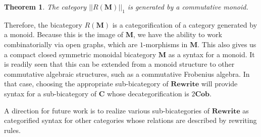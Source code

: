 \documentclass[11pt]{amsart}
\newcommand{\cat}[1]{\mathbf{#1}}
\newtheorem{thm}{Theorem}[section]
\theoremstyle{remark}
\theoremstyle{definition}
\begin{document}
\begin{thm}
	The category $||R(\cat{M})||_1$ is generated by a commutative monoid.
\end{thm}

Therefore, the bicategory $R (\cat{M})$ is a categorification of a category generated by a monoid.  Because this is the image of $\cat{M}$, we have the ability to work combinatorially via open graphs, which are $1$-morphisms in $\cat{M}$.  This also gives us a compact closed symmetric monoidal bicategory $\cat{M}$ as a syntax for a monoid.  It is readily seen that this can be extended from a monoid structure to other commutative algebraic structures, such as a commutative Frobenius algebra. In that case, choosing the appropriate sub-bicategory of $\cat{Rewrite}$ will provide syntax for a sub-bicategory of $\cat{C}$ whose decategorification is $2\cat{Cob}$. 

A direction for future work is to realize various sub-bicategories of $\cat{Rewrite}$ as categorified syntax for other categories whose relations are described by rewriting rules.



%
%
\end{document}
